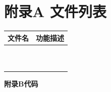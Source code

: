 \section{附录A 文件列表}
\begin{table}[H] %
\centering %
\begin{tabular}{|c|c|} %
\hline %
文件名 & 功能描述 \\ \hline
 &  \\ \hline
 &  \\ \hline
 &  \\ \hline
 &  \\ \hline
 &  \\ \hline
 &  \\ \hline
 &  \\ \hline
 &  \\ \hline
 &  \\ \hline
 &  \\ \hline
\end{tabular}
\end{table}


\begin{center}
\Large\textbf{附录B代码}
\end{center}




